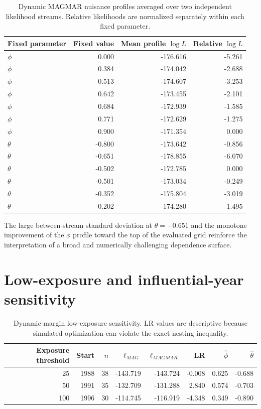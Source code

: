 \documentclass[11pt]{article}
\theoremstyle{definition}
\begin{document}
\begin{table}[H]
\centering
\caption{Dynamic MAGMAR nuisance profiles averaged over two independent likelihood streams. Relative likelihoods are normalized separately within each fixed parameter.}
\label{tab:profiles}
\small
\begin{tabular}{lrrr}
\toprule
Fixed parameter & Fixed value & Mean profile $\log L$ & Relative $\log L$ \\
\midrule
$\phi$ & 0.000 & -176.616 & -5.261 \\
$\phi$ & 0.384 & -174.042 & -2.688 \\
$\phi$ & 0.513 & -174.607 & -3.253 \\
$\phi$ & 0.642 & -173.455 & -2.101 \\
$\phi$ & 0.684 & -172.939 & -1.585 \\
$\phi$ & 0.771 & -172.629 & -1.275 \\
$\phi$ & 0.900 & -171.354 & 0.000 \\
\midrule
$\theta$ & -0.800 & -173.642 & -0.856 \\
$\theta$ & -0.651 & -178.855 & -6.070 \\
$\theta$ & -0.502 & -172.785 & 0.000 \\
$\theta$ & -0.501 & -173.034 & -0.249 \\
$\theta$ & -0.352 & -175.804 & -3.019 \\
$\theta$ & -0.202 & -174.280 & -1.495 \\
\bottomrule
\end{tabular}
\end{table}

The large between-stream standard deviation at $\theta=-0.651$ and the monotone
improvement of the $\phi$ profile toward the top of the evaluated grid reinforce the
interpretation of a broad and numerically challenging dependence surface.

\section{Low-exposure and influential-year sensitivity}
\label{app:sensitivity}

\begin{table}[H]
\centering
\caption{Dynamic-margin low-exposure sensitivity. LR values are descriptive because simulated optimization can violate the exact nesting inequality.}
\label{tab:low-exposure}
\small
\begin{tabular}{rrrrrrrr}
\toprule
Exposure threshold & Start & $n$ & $\ell_{MAG}$ & $\ell_{MAGMAR}$ & LR & $\widehat\phi$ & $\widehat\theta$ \\
\midrule
25  & 1988 & 38 & -143.719 & -143.724 & -0.008 & 0.625 & -0.688 \\
50  & 1991 & 35 & -132.709 & -131.288 & 2.840 & 0.574 & -0.703 \\
100 & 1996 & 30 & -114.745 & -116.919 & -4.348 & 0.349 & -0.890 \\
\bottomrule
\end{tabular}
\end{table}
\end{document}

